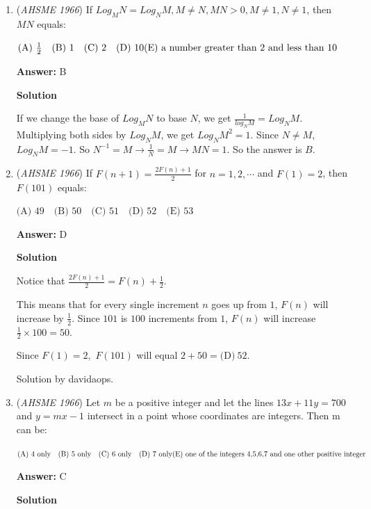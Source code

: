 \begin{enumerate}
	\item (\textit{AHSME 1966}) If $Log_M{N}=Log_N{M},M \ne N,MN>0,M \ne 1, N \ne 1$, then $MN$ equals:


 $\text{(A) } \frac{1}{2} \quad \text{(B) } 1 \quad \text{(C) } 2 \quad \text{(D) } 10 \\ \text{(E) a number greater than 2 and less than 10}$

 \textbf{Answer: }B



\textbf{Solution}

If we change the base of $Log_M{N}$ to base $N$, we get $\frac{1}{log_N{M}}= Log_N{M}$. Multiplying both sides by $Log_N{M}$, we get $Log_N{M}^2=1$. Since $N\not = M$, $Log_N{M}=-1$. So $N^{-1}=M \rightarrow \frac{1}{N} = M \rightarrow MN=1$. So the answer is $\boxed{B}$.

 


	\item (\textit{AHSME 1966}) If $F(n+1)=\frac{2F(n)+1}{2}$ for $n=1,2,\cdots$ and $F(1)=2$, then $F(101)$ equals:


 $\text{(A) } 49 \quad \text{(B) } 50 \quad \text{(C) } 51 \quad \text{(D) } 52 \quad \text{(E) } 53$

 \textbf{Answer: }D



\textbf{Solution}

Notice that $\frac{2F(n)+1}{2}=F(n)+\frac{1}{2}.$

 This means that for every single increment $n$ goes up from $1$, $F(n)$ will increase by $\frac{1}{2}.$ Since $101$ is $100$ increments from $1$, $F(n)$ will increase $\frac{1}{2}\times100=50.$

 Since $F(1)=2,$ $F(101)$ will equal $2+50=\boxed{\text{(D)} \ 52}.$

 
Solution by davidaops.

 


	\item (\textit{AHSME 1966}) Let $m$ be a positive integer and let the lines $13x+11y=700$ and $y=mx-1$ intersect in a point whose coordinates are integers. Then m can be:


 $\text{(A) 4 only} \quad \text{(B) 5 only} \quad \text{(C) 6 only} \quad \text{(D) 7 only} \\ \text{(E) one of the integers 4,5,6,7 and one other positive integer}$

 \textbf{Answer: }C



\textbf{Solution}


\end{enumerate}
